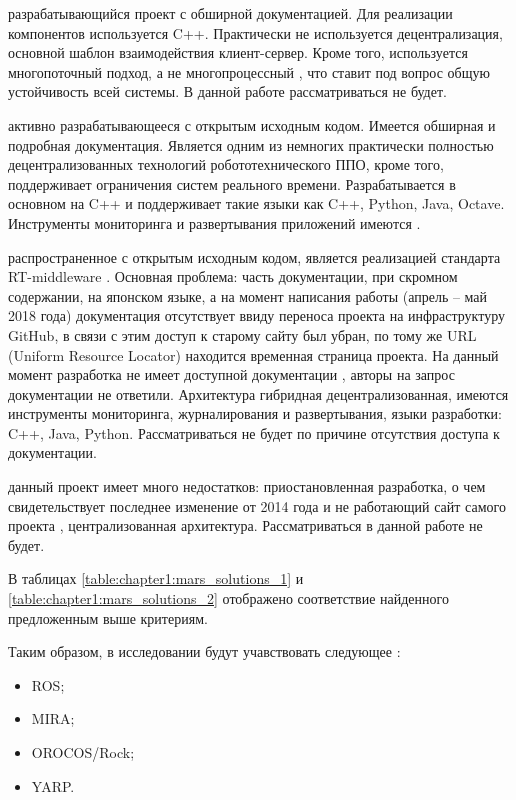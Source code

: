 \begin{description}[noitemsep]
	\item [SmartSoft] разрабатывающийся проект с обширной документацией. Для реализации компонентов используется C++. Практически не используется децентрализация, основной шаблон взаимодействия клиент-сервер. Кроме того, используется многопоточный подход, а не многопроцессный \cite{smartsoft-main-site}, что ставит под вопрос общую устойчивость всей системы. В данной работе рассматриваться не будет.
	
	\item [YARP] активно разрабатывающееся \marm{} с открытым исходным кодом. Имеется обширная и подробная документация. Является одним из немногих практически полностью децентрализованных технологий робототехнического ППО, кроме того, поддерживает ограничения систем реального времени. Разрабатывается в основном на C++ и поддерживает такие языки как C++, Python, Java, Octave. Инструменты мониторинга и развертывания приложений имеются \cite{yarp-main-site}.
	
	\item [OpenRTM-aist] распространенное \marm{} с открытым исходным кодом, является реализацией стандарта RT-middleware \cite{openrtmaist-old-site}. Основная проблема: часть документации, при скромном содержании, на японском языке, а на момент написания работы (апрель -- май 2018 года) документация отсутствует ввиду переноса проекта на инфраструктуру GitHub, в связи с этим доступ к старому сайту был убран, по тому же URL (Uniform Resource Locator) находится временная страница проекта. На данный момент разработка не имеет доступной документации \cite{openrtmaist-new-site}, авторы на запрос документации не ответили. Архитектура гибридная децентрализованная, имеются инструменты мониторинга, журналирования и развертывания, языки разработки: C++, Java, Python. Рассматриваться не будет по причине отсутствия доступа к документации.
	
	\item [URBI] данный проект имеет много недостатков: приостановленная разработка, о чем свидетельствует последнее изменение от 2014 года \cite{urbi-repo} и не работающий сайт самого проекта \cite{urbi-main-site}, централизованная архитектура. Рассматриваться в данной работе не будет. 
\end{description}

В таблицах \ref{table:chapter1:mars_solutions_1} и \ref{table:chapter1:mars_solutions_2} отображено соответствие найденного \marm{} предложенным выше критериям.

Таким образом, в исследовании будут учавствовать следующее \marm{}:
\begin{itemize}[noitemsep]
	\item ROS;
	\item MIRA;
	\item OROCOS/Rock;
	\item YARP.
\end{itemize}


